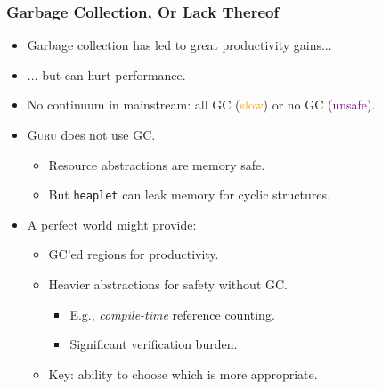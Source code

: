 \documentclass[10pt]{beamer}
\begin{document}
\begin{frame}
\frametitle{Garbage Collection, Or Lack Thereof}
\begin{itemize}
\item Garbage collection has led to great productivity gains...
\item ... but can hurt performance.
\item No continuum in mainstream: all GC (\textcolor{orange}{slow}) or no GC (\textcolor{purple}{unsafe}).
\item \textsc{Guru} does not use GC.
\begin{itemize}
\item Resource abstractions are memory safe.
\item But \texttt{heaplet} can leak memory for cyclic structures.
\end{itemize}
\item A perfect world might provide:
\begin{itemize}
\item GC'ed regions for productivity.
\item Heavier abstractions for safety without GC.
\begin{itemize}
\item E.g., \emph{compile-time} reference counting.
\item Significant verification burden.
\end{itemize}
\item Key: ability to choose which is more appropriate.
\end{itemize}
\end{itemize}
\end{frame}
\end{document}
